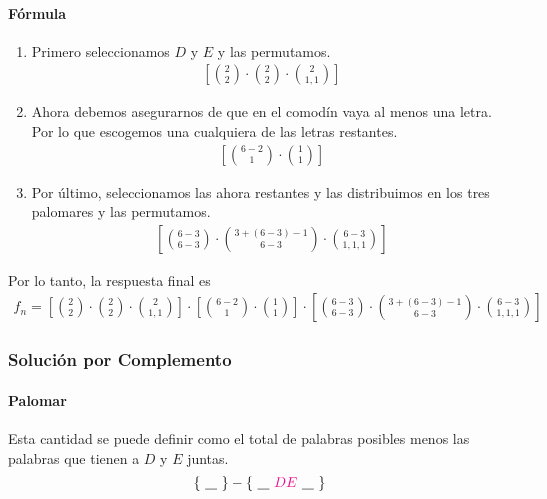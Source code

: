 \paragraph{Fórmula}
\begin{enumerate}
\item Primero seleccionamos $D$ y $E$ y las permutamos.
\begin{align*}
\left[\binom{2}{2}\cdot\binom{2}{2}\cdot\binom{2}{1,1}\right]
\end{align*}
\item Ahora debemos asegurarnos de que en el comodín vaya al menos una letra. Por lo que escogemos una cualquiera de las letras restantes.
\begin{align*}
\left[\binom{6-2}{1}\cdot\binom{1}{1}\right]
\end{align*}
\item Por último, seleccionamos las ahora restantes y las distribuimos en los tres palomares y las permutamos.
\begin{align*}
\left[\binom{6-3}{6-3}\cdot\binom{3+(6-3)-1}{6-3}\cdot\binom{6-3}{1,1,1}\right]
\end{align*}
\end{enumerate}
Por lo tanto, la respuesta final es
\begin{align*}
f_n=\left[\binom{2}{2}\cdot\binom{2}{2}\cdot\binom{2}{1,1}\right]\cdot\left[\binom{6-2}{1}\cdot\binom{1}{1}\right]\cdot\left[\binom{6-3}{6-3}\cdot\binom{3+(6-3)-1}{6-3}\cdot\binom{6-3}{1,1,1}\right]
\end{align*}

\subsubsection{Solución por Complemento}

\paragraph{Palomar}
Esta cantidad se puede definir como el total de palabras posibles menos las palabras que tienen a $D$ y $E$ juntas.
\begin{equation*}
\left\{~\underline{\hspace{0.3cm}}~\right\}-\left\{~\underline{\hspace{0.3cm}}~ {\color{magenta} DE} ~\underline{\hspace{0.3cm}}~\right\}
\end{equation*}

